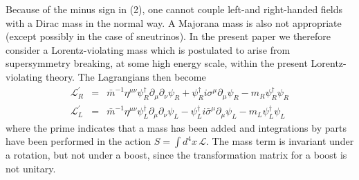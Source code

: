 \documentclass{ws-procs9x6}
\begin{document}
Because of the minus sign in (2), one cannot couple left-and right-handed
fields with a Dirac mass in the normal way. A Majorana mass is also not
appropriate (except possibly in the case of sneutrinos). In the present
paper we therefore consider a Lorentz-violating mass which is postulated to
arise from supersymmetry breaking, at some high energy scale, within the
present Lorentz-violating theory. The Lagrangians then become
\begin{eqnarray}
\mathcal{L}_{R}^{\prime } &=&\bar{m}^{-1}\eta ^{\mu \nu }\psi _{R}^{\dagger
}\partial _{\mu }\partial _{\nu }\psi _{R}+\psi _{R}^{\dagger }i\sigma ^{\mu
}\partial _{\mu }\psi _{R}-m_{R}\psi _{R}^{\dagger }\psi _{R} \\
\mathcal{L}_{L}^{\prime } &=&\bar{m}^{-1}\eta ^{\mu \nu }\psi _{L}^{\dagger
}\partial _{\mu }\partial _{\nu }\psi _{L}-\psi _{L}^{\dagger }i\bar{\sigma}
^{\mu }\partial _{\mu }\psi _{L}-m_{L}\psi _{L}^{\dagger }\psi _{L}
\end{eqnarray}
where the prime indicates that a mass has been added and integrations by
parts have been performed in the action $S=\int d^{4}x\,\mathcal{L}$. The
mass term is invariant under a rotation, but not under a boost, since the
transformation matrix for a boost is not unitary.
\end{document}

